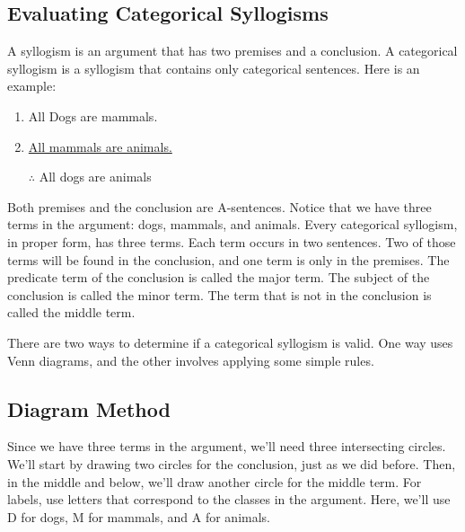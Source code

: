 \subsection{Evaluating Categorical Syllogisms}

A syllogism is an argument that has two premises and a conclusion. A categorical syllogism is a syllogism that contains only categorical sentences. Here is an example:

\begin{enumerate}
\item All Dogs are mammals.
\item \underline{All mammals are animals.}
\item [$\therefore$]All dogs are animals
\end{enumerate}

Both premises and the conclusion are A-sentences. Notice that we have three terms in the argument: dogs, mammals, and animals. Every categorical syllogism, in proper form, has three terms. Each term occurs in two sentences. Two of those terms will be found in the conclusion, and one term is only in the premises. The predicate term of the conclusion is called the major term. The subject of the conclusion is called the minor term. The term that is not in the conclusion is called the middle term.

There are two ways to determine if a categorical syllogism is valid. One way uses Venn diagrams, and the other involves applying some simple rules.

\subsection{Diagram Method}

Since we have three terms in the argument, we'll need three intersecting circles. We'll start by drawing two circles for the conclusion, just as we did before. Then, in the middle and below, we'll draw another circle for the middle term. For labels, use letters that correspond to the classes in the argument. Here, we'll use D for dogs, M for mammals, and A for animals.


